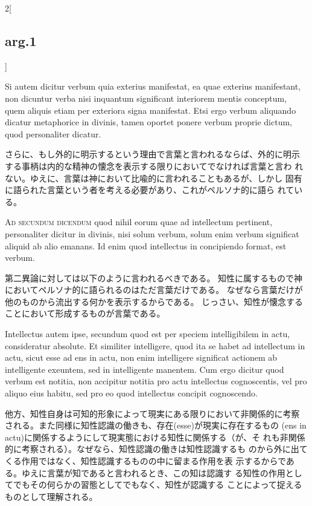 \documentclass[paper=a4paper,fontsize=10pt,jafontsize=9pt,titlepage]{jlreq}
\begin{document}
\begin{paracol}{2}[\subsection{arg.1}]
\switchcolumn*

Si autem dicitur verbum quia exterius manifestat,
 ea quae exterius manifestant, non dicuntur verba nisi inquantum
 significant interiorem mentis conceptum, quem aliquis etiam per
 exteriora signa manifestat. Etsi ergo verbum aliquando dicatur
 metaphorice in divinis, tamen oportet ponere verbum proprie dictum,
 quod personaliter dicatur.

\switchcolumn

さらに、もし外的に明示するという理由で言葉と言われるならば、外的に明示
 する事柄は内的な精神の懐念を表示する限りにおいてでなければ言葉と言わ
 れない。ゆえに、言葉は神において比喩的に言われることもあるが、しかし
 固有に語られた言葉という者を考える必要があり、これがペルソナ的に語ら
 れている。

\switchcolumn*[\subsection{ad.2}]

{\scshape Ad secundum dicendum} quod nihil eorum quae ad intellectum pertinent,
 personaliter dicitur in divinis, nisi solum verbum, solum enim verbum
 significat aliquid ab alio emanans. Id enim quod intellectus in
 concipiendo format, est verbum.

\switchcolumn

第二異論に対しては以下のように言われるべきである。
知性に属するもので神においてペルソナ的に語られるのはただ言葉だけである。
 なぜなら言葉だけが他のものから流出する何かを表示するからである。
じっさい、知性が懐念することにおいて形成するものが言葉である。

\switchcolumn*

Intellectus autem ipse, secundum quod
 est per speciem intelligibilem in actu, consideratur absolute. Et
 similiter intelligere, quod ita se habet ad intellectum in actu,
 sicut esse ad ens in actu, non enim intelligere significat actionem
 ab intelligente exeuntem, sed in intelligente manentem. Cum ergo
 dicitur quod verbum est notitia, non accipitur notitia pro actu
 intellectus cognoscentis, vel pro aliquo eius habitu, sed pro eo quod
 intellectus concipit cognoscendo.

\switchcolumn

他方、知性自身は可知的形象によって現実にある限りにおいて非関係的に考察
 される。また同様に知性認識の働きも、存在(esse)が現実に存在するもの
 (ens in actu)に関係するようにして現実態における知性に関係する（が、そ
 れも非関係的に考察される）。なぜなら、知性認識の働きは知性認識するも
 のから外に出てくる作用ではなく、知性認識するものの中に留まる作用を表
 示するからである。ゆえに言葉が知であると言われるとき、この知は認識す
 る知性の作用としてでもその何らかの習態としてでもなく、知性が認識する
 ことによって捉えるものとして理解される。


\end{paracol}
\end{document}
